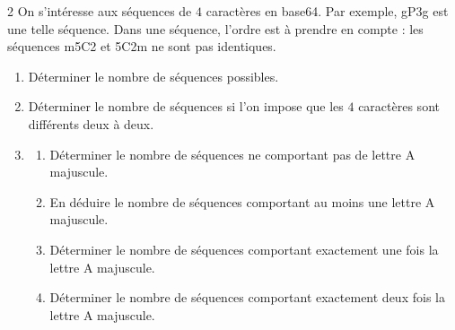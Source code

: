 \documentclass[a4paper,10pt]{article}
\begin{document}
\begin{multicols}{2}
On s'intéresse aux séquences de $4$ caractères en base64. Par exemple, \og gP3g\fg{}
est une telle séquence. Dans une séquence, l'ordre est à prendre en compte : les
séquences \og m5C2\fg{} et \og 5C2m\fg{} ne sont pas identiques.
\begin{enumerate}
  \item Déterminer le nombre de séquences possibles.
  \item Déterminer le nombre de séquences si l'on impose que les $4$ caractères sont
        différents deux à deux.
  \item
        \begin{enumerate}[label=\alph*)]
          \item Déterminer le nombre de séquences ne comportant pas de lettre A
                majuscule.
          \item En déduire le nombre de séquences comportant au moins une lettre A
                majuscule.
          \item Déterminer le nombre de séquences comportant exactement une fois la
                lettre A majuscule.
          \item Déterminer le nombre de séquences comportant exactement deux fois la
                lettre A majuscule.
        \end{enumerate}
\end{enumerate}

\end{multicols}
\end{document}
